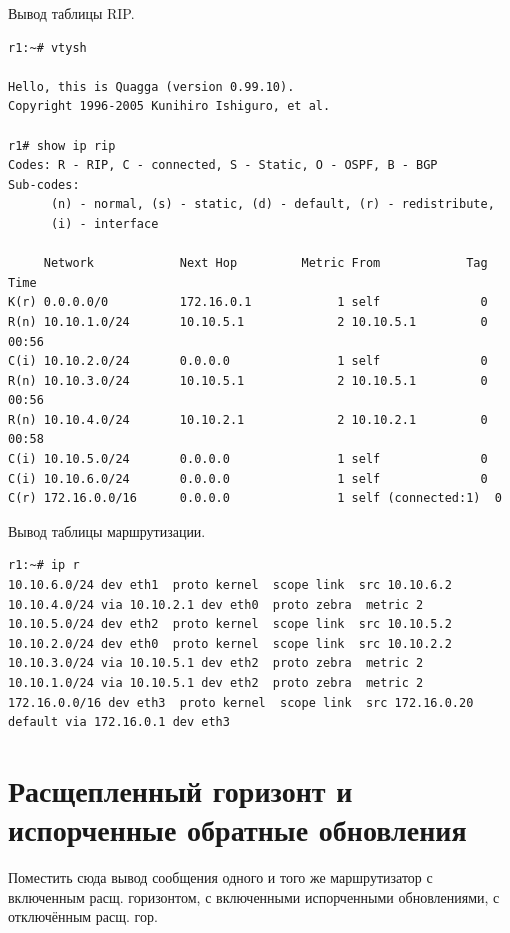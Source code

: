 \documentclass[a4paper,12pt]{article}
\begin{document}
Вывод таблицы RIP.

\begin{Verbatim}
r1:~# vtysh 

Hello, this is Quagga (version 0.99.10).
Copyright 1996-2005 Kunihiro Ishiguro, et al.

r1# show ip rip
Codes: R - RIP, C - connected, S - Static, O - OSPF, B - BGP
Sub-codes:
      (n) - normal, (s) - static, (d) - default, (r) - redistribute,
      (i) - interface

     Network            Next Hop         Metric From            Tag Time
K(r) 0.0.0.0/0          172.16.0.1            1 self              0
R(n) 10.10.1.0/24       10.10.5.1             2 10.10.5.1         0 00:56
C(i) 10.10.2.0/24       0.0.0.0               1 self              0
R(n) 10.10.3.0/24       10.10.5.1             2 10.10.5.1         0 00:56
R(n) 10.10.4.0/24       10.10.2.1             2 10.10.2.1         0 00:58
C(i) 10.10.5.0/24       0.0.0.0               1 self              0
C(i) 10.10.6.0/24       0.0.0.0               1 self              0
C(r) 172.16.0.0/16      0.0.0.0               1 self (connected:1)  0
\end{Verbatim}

Вывод таблицы маршрутизации.

\begin{Verbatim}
r1:~# ip r
10.10.6.0/24 dev eth1  proto kernel  scope link  src 10.10.6.2 
10.10.4.0/24 via 10.10.2.1 dev eth0  proto zebra  metric 2 
10.10.5.0/24 dev eth2  proto kernel  scope link  src 10.10.5.2 
10.10.2.0/24 dev eth0  proto kernel  scope link  src 10.10.2.2 
10.10.3.0/24 via 10.10.5.1 dev eth2  proto zebra  metric 2 
10.10.1.0/24 via 10.10.5.1 dev eth2  proto zebra  metric 2 
172.16.0.0/16 dev eth3  proto kernel  scope link  src 172.16.0.20 
default via 172.16.0.1 dev eth3
\end{Verbatim}


\section{Расщепленный горизонт и испорченные обратные обновления}

Поместить сюда вывод сообщения одного и того же маршрутизатор с включенным расщ. горизонтом, с включенными испорченными обновлениями, с отключённым расщ. гор.
\end{document}
